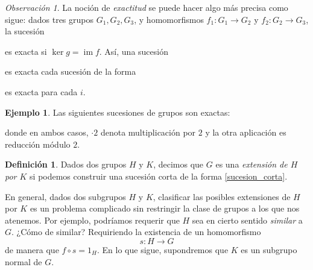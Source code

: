 \documentclass[a4paper,11pt]{amsart}
\DeclareMathOperator{\im}{im}
\theoremstyle{plain}
\theoremstyle{definition}
\newtheorem{defi}[thm]{Definición}
\newtheorem{ej}[thm]{Ejemplo}
\theoremstyle{remark}
\newtheorem*{rem}{Observación}
\begin{document}
\begin{rem}
La noción de \textit{exactitud} se puede hacer algo más precisa como sigue: dados tres grupos $G_1, G_2, G_3$, y homomorfismos $f_1 \colon G_1 \to G_2$ y $f_2 \colon G_2 \to G_3$, la sucesión 
\begin{center}
\end{center}
es exacta si $\ker g = \im f$. Así, una sucesión 
\begin{center}
\end{center}
es exacta cada sucesión de la forma
\begin{center}
\end{center}
es exacta para cada $i$.
\end{rem}


\begin{ej}
\label{ej_sucesion_split}
Las siguientes sucesiones de grupos son exactas: 
\begin{center}
\end{center}
donde en ambos casos, $\cdot 2$ denota multiplicación por $2$ y la otra aplicación es reducción módulo $2$. 
\end{ej}


\begin{defi}
Dados dos grupos $H$ y $K$, decimos que $G$ es una \textit{extensión de $H$ por $K$} si podemos construir una sucesión corta de la forma \eqref{sucesion_corta}.
\end{defi}

En general, dados dos subgrupos $H$ y $K$, clasificar las posibles extensiones de $H$ por $K$ es un problema complicado sin restringir la clase de grupos a los que nos atenemos. Por ejemplo, podríamos requerir que $H$ sea en cierto sentido \textit{similar} a $G$. ¿Cómo de similar? Requiriendo la existencia de un homomorfismo 
\[ s \colon H \to G\]
de manera que $f \circ s = 1_H$. En lo que sigue, supondremos que $K$ es un subgrupo normal de $G$. 
\end{document}
